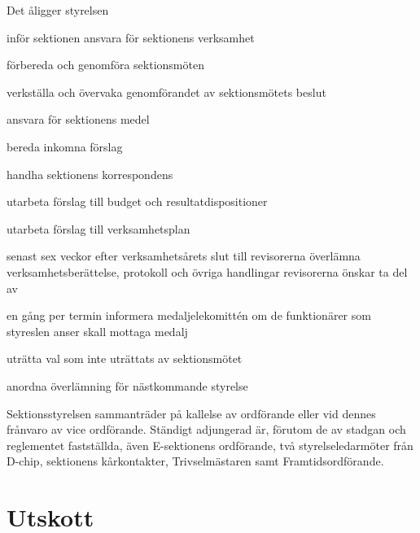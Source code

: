 \documentclass[pdfbookmarks,a4paper,11pt]{article}
\newlength{\itemcollength}
\newenvironment{reglemlista}{%
  \begin{list}{}{%
      \setlength{\labelwidth}{\itemcollength}%
      \setlength{\leftmargin}{\labelwidth + \labelsep}%
      \renewcommand{\makelabel}[1]{%
        \raisebox{0pt}[1ex][0pt]{%
          \makebox[\labelwidth][l]{%
            \parbox[t]{\itemcollength}{%
              \raggedright\hspace{0pt}##1}}}\hfill}%
      }}{%
  \end{list}}
\begin{document}
\begin{reglemlista}

	\item[Åligganden]
	Det åligger styrelsen
	\begin{attlista}
		\item inför sektionen ansvara för sektionens verksamhet
		\item förbereda och genomföra sektionsmöten
		\item verkställa och övervaka genomförandet av sektionsmötets beslut
		\item ansvara för sektionens medel
		\item bereda inkomna förslag
		\item handha sektionens korrespondens
		\item utarbeta förslag till budget och resultatdispositioner
		\item utarbeta förslag till verksamhetsplan
		\item senast sex veckor efter verksamhetsårets slut till revisor\-erna överlämna verksamhetsberättelse, protokoll och övriga handlingar revisorerna önskar ta del av
		\item en gång per termin informera medaljelekomittén om de funktionärer som styreslen anser skall mottaga medalj
		\item uträtta val som inte uträttats av sektionsmötet
		\item anordna överlämning för nästkommande styrelse
	\end{attlista}

	\item[Sammanträde]
	Sektionsstyrelsen sammanträder på kallelse av ordförande eller vid dennes frånvaro av vice ordförande. Ständigt adjungerad är, förutom de av stadgan och reglementet fastställda, även E-sektionens
	ordförande, två styrelseledarmöter från D-chip, sektionens kårkontakter, Trivselmästaren samt Framtidsordförande.

\end{reglemlista}

\section{Utskott}
\end{document}
